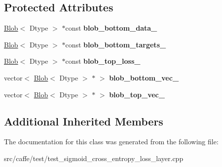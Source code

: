 \subsection*{Protected Attributes}
\begin{DoxyCompactItemize}
\item 
\mbox{\label{classcaffe_1_1_sigmoid_cross_entropy_loss_layer_test_a421b391987d429c12844448d975d15bb}} 
\mbox{\hyperlink{classcaffe_1_1_blob}{Blob}}$<$ Dtype $>$ $\ast$const {\bfseries blob\+\_\+bottom\+\_\+data\+\_\+}
\item 
\mbox{\label{classcaffe_1_1_sigmoid_cross_entropy_loss_layer_test_aa045aef8aa91bfeca68be05e5a7cb80c}} 
\mbox{\hyperlink{classcaffe_1_1_blob}{Blob}}$<$ Dtype $>$ $\ast$const {\bfseries blob\+\_\+bottom\+\_\+targets\+\_\+}
\item 
\mbox{\label{classcaffe_1_1_sigmoid_cross_entropy_loss_layer_test_af93d1b5f87b9e2a6332f7c4f9a474396}} 
\mbox{\hyperlink{classcaffe_1_1_blob}{Blob}}$<$ Dtype $>$ $\ast$const {\bfseries blob\+\_\+top\+\_\+loss\+\_\+}
\item 
\mbox{\label{classcaffe_1_1_sigmoid_cross_entropy_loss_layer_test_ac3ebe4a4e0072edca439e8342ada2bc6}} 
vector$<$ \mbox{\hyperlink{classcaffe_1_1_blob}{Blob}}$<$ Dtype $>$ $\ast$ $>$ {\bfseries blob\+\_\+bottom\+\_\+vec\+\_\+}
\item 
\mbox{\label{classcaffe_1_1_sigmoid_cross_entropy_loss_layer_test_a12c91d85f8aa95448cc971a4ae3b1f62}} 
vector$<$ \mbox{\hyperlink{classcaffe_1_1_blob}{Blob}}$<$ Dtype $>$ $\ast$ $>$ {\bfseries blob\+\_\+top\+\_\+vec\+\_\+}
\end{DoxyCompactItemize}
\subsection*{Additional Inherited Members}


The documentation for this class was generated from the following file\+:\begin{DoxyCompactItemize}
\item 
src/caffe/test/test\+\_\+sigmoid\+\_\+cross\+\_\+entropy\+\_\+loss\+\_\+layer.\+cpp\end{DoxyCompactItemize}
